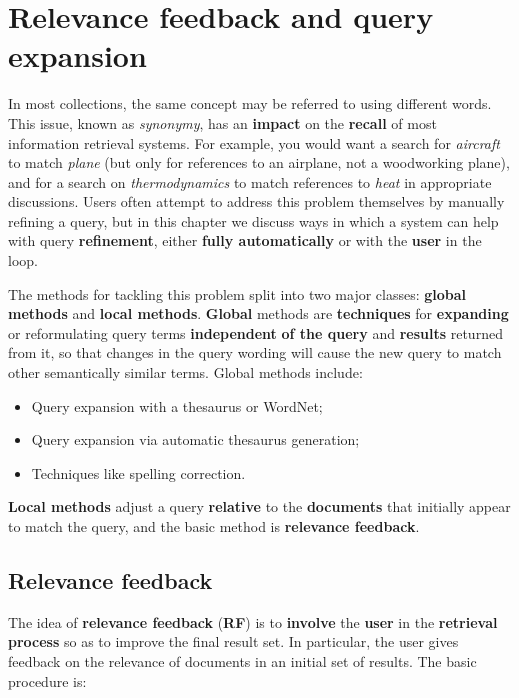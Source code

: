 \section{Relevance feedback and query expansion}
In most collections, the same concept may be referred to using different words. This issue, known as \textit{synonymy}, has an \textbf{impact} on the \textbf{recall} of most information retrieval systems. For example, you would want a search for \textit{aircraft} to match \textit{plane} (but only for references to an airplane, not a woodworking plane), and for a search on \textit{thermodynamics} to match references to \textit{heat} in appropriate discussions. Users often attempt to address this problem themselves by manually refining a query, but in this chapter we discuss ways in which a system can help with query \textbf{refinement}, either \textbf{fully automatically} or with the \textbf{user} in the loop. 

The methods for tackling this problem split into two major classes: \textbf{global methods} and \textbf{local methods}. \textbf{Global} methods are \textbf{techniques} for \textbf{expanding} or reformulating query terms \textbf{independent} \textbf{of the query} and \textbf{results} returned from it, so that changes in the query wording will cause the new query to match other semantically similar terms. Global methods include:

\begin{itemize}
    \item Query expansion with a thesaurus or WordNet;
    \item Query expansion via automatic thesaurus generation;
    \item Techniques like spelling correction.
\end{itemize}

\textbf{Local methods} adjust a query \textbf{relative} to the \textbf{documents} that initially appear to match the query, and the basic method is \textbf{relevance feedback}.

\subsection{Relevance feedback}
The idea of \textbf{relevance feedback} (\textbf{RF}) is to \textbf{involve} the \textbf{user} in the \textbf{retrieval process} so as to improve the final result set. In particular, the user gives feedback on the relevance of documents in an initial set of results. The basic procedure is:

